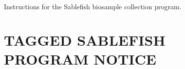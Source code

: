 \documentclass[12pt]{article}\usepackage[]{graphicx}\usepackage[]{color}
\begin{document}
\begin{appendices}
Instructions for the Sablefish biosample collection program.
\begin{center} \end{center}

\section{TAGGED SABLEFISH PROGRAM NOTICE}
\label{app:fourth-appendix}


\end{appendices}
\end{document}
